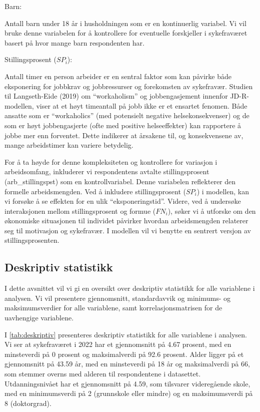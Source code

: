 \documentclass[
  12pt,
  a4paper,
  DIV=11,
  numbers=noendperiod]{scrartcl}
\begin{document}
Barn:

Antall barn under 18 år i husholdningen som er en kontinuerlig variabel.
Vi vil bruke denne variabelen for å kontrollere for eventuelle
forskjeller i sykefraværet basert på hvor mange barn respondenten har.

Stillingsprosent (\(SP_i\)):

Antall timer en person arbeider er en sentral faktor som kan påvirke
både eksponering for jobbkrav og jobbressurser og forekomsten av
sykefravær. Studien til Langseth-Eide (2019) om ``workaholism'' og
jobbengasjement innenfor JD-R-modellen, viser at et høyt timeantall på
jobb ikke er et ensartet fenomen. Både ansatte som er ``workaholics''
(med potensielt negative helsekonsekvenser) og de som er høyt
jobbengasjerte (ofte med positive helseeffekter) kan rapportere å jobbe
mer enn forventet. Dette indikerer at årsakene til, og konsekvensene av,
mange arbeidstimer kan variere betydelig.

For å ta høyde for denne kompleksiteten og kontrollere for variasjon i
arbeidsomfang, inkluderer vi respondentens avtalte stillingsprosent
(arb\_stillingspst) som en kontrollvariabel. Denne variabelen
reflekterer den formelle arbeidsmengden. Ved å inkludere
stillingsprosent (\(SP_i\)) i modellen, kan vi forsøke å se effekten for
en ulik ``eksponeringstid''. Videre, ved å undersøke interaksjonen
mellom stillingsprosent og formue (\(FN_i\)), søker vi å utforske om den
økonomiske situasjonen til individet påvirker hvordan arbeidsmengden
relaterer seg til motivasjon og sykefravær. I modellen vil vi benytte en
sentrert versjon av stillingsprosenten.

\subsection{Deskriptiv statistikk}\label{deskriptiv-statistikk}

I dette avsnittet vil vi gi en oversikt over deskriptiv statistikk for
alle variablene i analysen. Vi vil presentere gjennomsnitt,
standardavvik og minimums- og maksimumsverdier for alle variablene, samt
korrelasjonsmatrisen for de uavhengige variablene.

I \autoref{tab:deskriptiv} presenteres deskriptiv statistikk for alle
variablene i analysen. Vi ser at sykefraværet i 2022 har et gjennomsnitt
på 4.67 prosent, med en minsteverdi på 0 prosent og maksimalverdi på
92.6 prosent. Alder ligger på et gjennomsnitt på 43.59 år, med en
minsteverdi på 18 år og maksimalverdi på 66, som stemmer overns med
alderen til respondentene i datasettet. Utdanningsnivået har et
gjennomsnitt på 4.59, som tilsvarer videregående skole, med en
minimumsverdi på 2 (grunnskole eller mindre) og en maksimumsverdi på 8
(doktorgrad).
\end{document}
